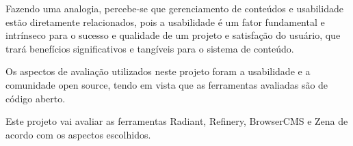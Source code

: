 

Fazendo uma analogia, percebe-se  que gerenciamento de conteúdos e usabilidade estão diretamente relacionados, pois a usabilidade é um fator fundamental e intrínseco para o sucesso e qualidade de um projeto e satisfação do usuário, que trará benefícios significativos e tangíveis para o sistema de conteúdo.

Os aspectos de avaliação utilizados neste projeto foram a usabilidade e a comunidade open source, tendo em vista que as ferramentas avaliadas são de código aberto. 



Este projeto vai avaliar as ferramentas Radiant, Refinery, BrowserCMS e Zena de acordo com os aspectos escolhidos.

